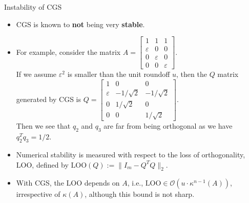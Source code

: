 \documentclass[t,usepdftitle=false]{beamer}
\begin{document}
\begin{frame}{Instability of CGS}
\begin{itemize}
\item CGS is known to \textbf{not} being very \textbf{stable}.
\item For example, consider the matrix $A=\begin{bmatrix}1&1&1\\\varepsilon&0&0\\0&\varepsilon&0\\0&0&\varepsilon\end{bmatrix}$.\vspace{.4cm}\\
If we assume $\varepsilon^2$ is smaller than the unit roundoff $u$, then the $Q$ matrix generated by CGS is $Q=\begin{bmatrix}1&0&0\\\varepsilon&-1/\sqrt{2}&-1/\sqrt{2}\\0&1/\sqrt{2}&0\\0&0&1/\sqrt{2}\end{bmatrix}$.\\
Then we see that $q_2$ and $q_3$ are far from being orthogonal as we have $q_2^Tq_3=1/2$.
\item Numerical stability is measured with respect to the loss of orthogonality, LOO, defined by $\text{LOO}(Q):=\|I_m-Q^TQ\|_2$.
\item With CGS, the LOO depends on $A$, i.e., $\mathrm{LOO}\in\mathcal{O}(u\cdot\kappa^{n-1}(A))$, irrespective of $\kappa(A)$, although this bound is not sharp.
\end{itemize}
\end{frame}
\end{document}
